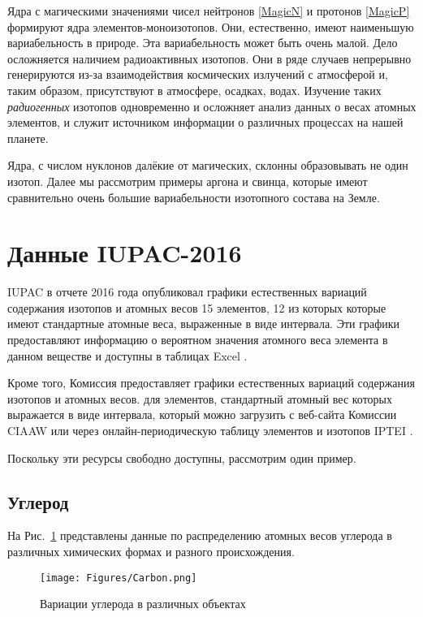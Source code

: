 \documentclass[a5paper,openany]{book}
\begin{document}
Ядра с магическими значениями чисел нейтронов \eqref{MagicN} и протонов \eqref{MagicP} формируют ядра элементов-моноизотопов. Они, естественно, имеют наименьшую вариабельность в природе.
Эта вариабельность может быть очень малой. Дело осложняется наличием радиоактивных изотопов.
Они в ряде случаев непрерывно генерируются из-за взаимодействия космических излучений с атмосферой и, таким образом, присутствуют  в атмосфере, осадках, водах. Изучение таких \emph{радиогенных} изотопов одновременно и осложняет анализ данных о весах атомных элементов, и служит источником информации о различных процессах на нашей планете.

Ядра, с числом нуклонов далёкие от магических, склонны образовывать не один изотоп. Далее мы рассмотрим примеры аргона и свинца, которые имеют сравнительно очень большие вариабельности изотопного состава на Земле.


\section{Данные IUPAC-2016}


IUPAC в отчете 2016 года опубликовал графики естественных вариаций содержания изотопов и атомных весов 15 элементов, 12 из которых которые имеют стандартные атомные веса, выраженные в виде интервала. Эти графики предоставляют информацию о вероятном значения атомного веса элемента в данном веществе \cite{IUPAC2016data, IUPAC2019data} и доступны в таблицах Excel \cite{IUPACTables}.

Кроме того, Комиссия предоставляет графики естественных вариаций содержания изотопов и атомных весов.
для элементов, стандартный атомный вес которых выражается в виде интервала, который можно загрузить с
веб-сайта Комиссии CIAAW \cite{CIAAWnaturalVariation} или через онлайн-периодическую таблицу элементов и изотопов IPTEI  \cite{IPTEI}.

Поскольку эти ресурсы свободно доступны, рассмотрим один пример.

\subsection{Углерод} \label{s:CarbonData}

На Рис.~\ref{f:CarbonVariation} представлены данные по распределению атомных весов углерода в различных химических формах и разного происхождения.
\begin{figure}[ht] 
	\centering\small
	\texttt{[image: Figures/Carbon.png]}
	\caption{Вариации углерода в различных объектах} 
	\label{f:CarbonVariation}
\end{figure}
\end{document}
